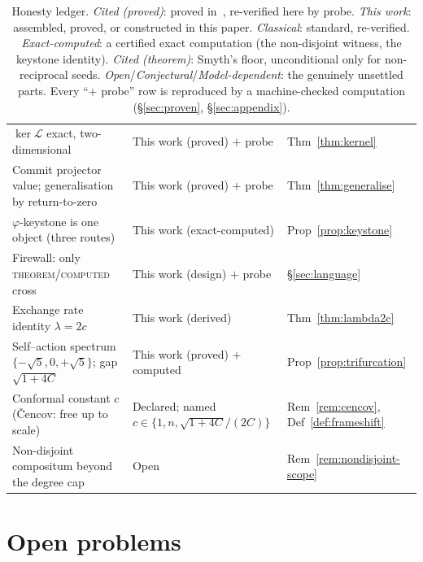 \documentclass[11pt]{article}
\theoremstyle{plain}
\theoremstyle{definition}
\theoremstyle{remark}
\newcommand{\Lop}{\mathcal{L}}
\begin{document}
\begin{table}[ht]
\begin{tabular}{p{} l l}
$\ker\Lop$ exact, two-dimensional & This work (proved) $+$ probe & Thm~\ref{thm:kernel} \\
Commit projector value; generalisation by return-to-zero & This work (proved) $+$ probe & Thm~\ref{thm:generalise} \\
$\varphi$-keystone is one object (three routes) & This work (exact-computed) & Prop~\ref{prop:keystone} \\
Firewall: only \textsc{theorem}/\textsc{computed} cross & This work (design) $+$ probe & \S\ref{sec:language} \\
Exchange rate identity $\lambda=2c$ & This work (derived) & Thm~\ref{thm:lambda2c} \\
Self--action spectrum $\{-\sqrt5,0,+\sqrt5\}$; gap $\sqrt{1+4C}$ & This work (proved) $+$ computed & Prop~\ref{prop:trifurcation} \\
Conformal constant $c$ (\v{C}encov: free up to scale) & Declared; named $c\in\{1,n,\sqrt{1+4C}/(2C)\}$ & Rem~\ref{rem:cencov}, Def~\ref{def:frameshift} \\
Non-disjoint compositum beyond the degree cap & Open & Rem~\ref{rem:nondisjoint-scope} \\
\bottomrule
\end{tabular}
\caption{Honesty ledger. \emph{Cited (proved)}: proved in~\cite{VectorSubstrate}, re-verified here by probe.
\emph{This work}: assembled, proved, or constructed in this paper. \emph{Classical}: standard, re-verified.
\emph{Exact-computed}: a certified exact computation (the non-disjoint witness, the keystone identity).
\emph{Cited (theorem)}: Smyth's floor, unconditional only for non-reciprocal seeds.
\emph{Open}/\emph{Conjectural}/\emph{Model-dependent}: the genuinely unsettled parts. Every ``$+$ probe'' row
is reproduced by a machine-checked computation (\S\ref{sec:proven}, \S\ref{sec:appendix}).}
\label{tab:ledger}
\end{table}

\section{Open problems}\label{sec:open}
\end{document}
